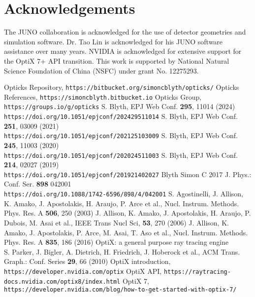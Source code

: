 \documentclass{webofc}
\begin{document}
\section*{Acknowledgements}
%
The JUNO collaboration is acknowledged for the use of detector 
geometries and simulation software. Dr. Tao Lin is acknowledged 
for his JUNO software assistance over many years. NVIDIA is acknowledged for extensive 
support for the OptiX 7+ API transition.
%
This work is supported by National Natural Science Foundation of China (NSFC)
under grant No. 12275293.
%
\begin{thebibliography}{}
%
Opticks Repository, {\tt https://bitbucket.org/simoncblyth/opticks/}
Opticks References, {\tt https://simoncblyth.bitbucket.io}
Opticks Group, {\tt https://groups.io/g/opticks}
S. Blyth, EPJ Web Conf. {\bf 295}, 11014 (2024) \\
{\tt https://doi.org/10.1051/epjconf/202429511014}
S. Blyth, EPJ Web Conf. {\bf 251}, 03009 (2021) \\
{\tt https://doi.org/10.1051/epjconf/202125103009}
S. Blyth, EPJ Web Conf. {\bf 245}, 11003 (2020) \\
{\tt https://doi.org/10.1051/epjconf/202024511003}
S. Blyth, EPJ Web Conf. {\bf 214}, 02027 (2019) \\
{\tt https://doi.org/10.1051/epjconf/201921402027}
Blyth Simon C 2017 J. Phys.: Conf. Ser. {\bf 898} 042001 \\
{\tt https://doi.org/10.1088/1742-6596/898/4/042001}
%
S. Agostinelli, J. Allison, K. Amako, J. Apostolakis, H. Araujo, P. Arce et al., Nucl. Instrum. Methods. Phys. Res. A {\bf 506}, 250 (2003)
J. Allison, K. Amako, J. Apostolakis, H. Araujo, P. Dubois, M. Asai et al., IEEE Trans Nucl Sci, {\bf 53}, 270 (2006)
J. Allison, K. Amako, J. Apostolakis, P. Arce, M. Asai, T. Aso et al., Nucl. Instrum. Methods. Phys. Res. A {\bf 835}, 186 (2016)
%
%
OptiX: a general purpose ray tracing engine \\
S. Parker, J. Bigler, A. Dietrich, H. Friedrich, J. Hoberock et al., ACM Trans. Graph.: Conf. Series {\bf 29}, 66 (2010)
OptiX introduction, {\tt https://developer.nvidia.com/optix}
OptiX API, {\tt https://raytracing-docs.nvidia.com/optix8/index.html}
OptiX 7, {\tt https://developer.nvidia.com/blog/how-to-get-started-with-optix-7/}

\end{thebibliography}
\end{document}
